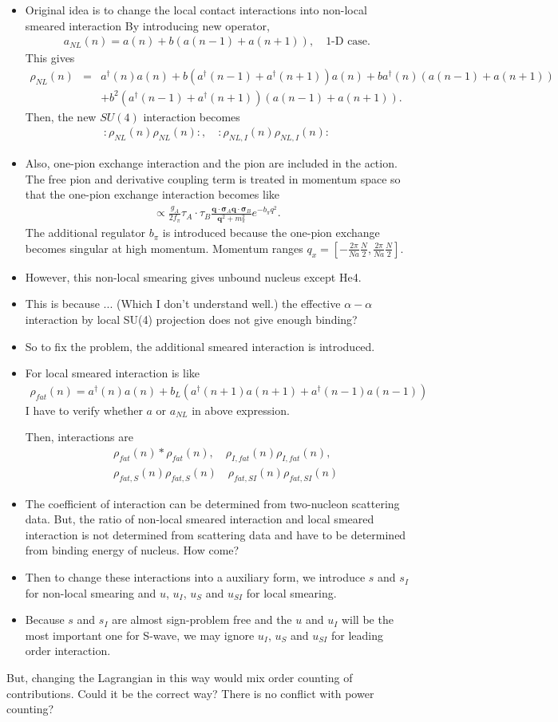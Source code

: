 \documentclass[10pt]{book}
\def\bm{\boldsymbol}
\newcommand{\bea}{\begin{eqnarray}}
\newcommand{\eea}{\end{eqnarray}}
\newcommand{\no}{\nonumber \\}
\def\vs{{\bm \sigma}}
\def\vq{{\bm q}}
\begin{document}
\begin{itemize}
\item Original idea is to change the local contact interactions into non-local 
smeared interaction By introducing new operator,
\bea 
a_{NL}(n)=a(n)+b(a(n-1)+a(n+1)),\quad \mbox{1-D case}.
\eea 
This gives
\bea 
\rho_{NL}(n)&=&a^\dagger(n) a(n)+b(a^\dagger(n-1)+a^\dagger(n+1))a(n)
+b a^\dagger (n)(a(n-1)+a(n+1))
\no & &
+b^2 (a^\dagger(n-1)+a^\dagger(n+1))(a(n-1)+a(n+1)).
\eea 
Then, the new $SU(4)$ interaction becomes
\bea 
:\rho_{NL}(n)\rho_{NL}(n):, \quad :\rho_{NL,I}(n)\rho_{NL,I}(n):
\eea 
\item Also, one-pion exchange interaction and the pion are included in the action.
      The free pion and derivative coupling term is treated in momentum space 
      so that the one-pion exchange interaction becomes like
      \bea 
      \propto \frac{g_A}{2f_\pi} \tau_A\cdot\tau_B
              \frac{\vq\cdot\vs_A\vq\cdot\vs_B}{\vq^2+m_\pi^2} e^{-b_\pi q^2}.
      \eea 
      The additional regulator $b_\pi$ is introduced because the 
      one-pion exchange becomes singular at high momentum.
      Momentum ranges $q_x=[-\frac{2\pi}{N a}\frac{N}{2},\frac{2\pi}{N a}\frac{N}{2}]$.
\item However, this non-local smearing gives unbound nucleus except He4. 
\item This is because ... (Which I don't understand well.) the effective $\alpha-\alpha$
      interaction by local SU(4) projection does not give enough binding?
\item So to fix the problem, the additional smeared interaction is introduced. 
\item For local smeared interaction is like
      \bea 
      \rho_{fat}(n)=a^\dagger(n)a(n)+b_L(a^\dagger(n+1)a(n+1)+a^\dagger(n-1)a(n-1)) 
      \eea
      {\color{red} I have to verify whether $a$ or $a_{NL}$ in above expression.}
                  
       Then, interactions are
       \bea 
       & &\rho_{fat}(n)*\rho_{fat}(n),\quad 
       \rho_{I,fat}(n)\rho_{I,fat}(n), \no 
       & &\rho_{fat,S}(n) \rho_{fat,S}(n)\quad 
          \rho_{fat,SI}(n)\rho_{fat,SI}(n)
       \eea 
\item The coefficient of interaction can be determined from two-nucleon scattering data.
      But, the ratio of non-local smeared interaction and local smeared interaction 
      is not determined from scattering data and have to be determined from binding energy of nucleus.
      How come?
\item Then to change these interactions into a auxiliary form, 
      we introduce $s$ and $s_I$ for non-local
      smearing and $u$, $u_I$, $u_S$ and $u_{SI}$ for local smearing. 
\item Because $s$ and $s_I$ are almost sign-problem free and the $u$ and $u_I$ will be 
      the most important one for S-wave, we may ignore $u_I$, $u_S$ and $u_{SI}$      
      for leading order interaction. 
      
\end{itemize}
But, changing the Lagrangian in this way would mix order counting of contributions. 
Could it be the correct way? There is no conflict with power counting?
\end{document}

